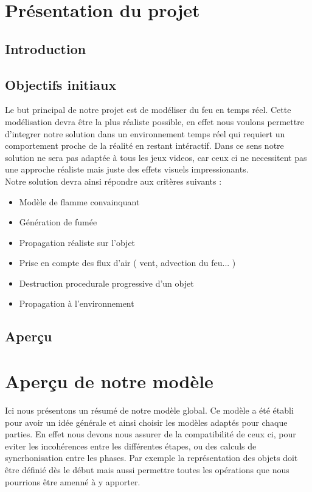 \documentclass[a4paper,10pt]{article}
\begin{document}
\newpage

\tableofcontents

\newpage



\section{Présentation du projet}
\subsection{Introduction}

\subsection{Objectifs initiaux}
Le but principal de notre projet est de modéliser du feu en temps
réel. Cette modélisation devra être la plus réaliste possible, en
effet nous voulons permettre d'integrer notre solution dans un
environnement temps réel qui requiert un comportement proche de la
réalité en restant intéractif. Dans ce sens notre solution ne sera pas
adaptée à tous les jeux videos, car ceux ci ne necessitent pas une
approche réaliste mais juste des effets visuels impressionants.\\

Notre solution devra ainsi répondre aux critères suivants :
\begin{itemize}
\item Modèle de flamme convainquant 
\item Génération de fumée
\item Propagation réaliste sur l'objet 
\item Prise en compte des flux d'air ( vent, advection du feu... )
\item Destruction procedurale progressive d'un objet
\item Propagation à l'environnement
\end{itemize}

\subsection{Aperçu}

\section{Aperçu de notre modèle}
Ici nous présentons un résumé de notre modèle global. Ce modèle a été
établi pour avoir un idée générale et ainsi choisir les modèles
adaptés pour chaque parties. En effet nous devons nous assurer de la
compatibilité de ceux ci, pour eviter les incohérences entre les
différentes étapes, ou des calculs de syncrhonisation entre les
phases. Par exemple la représentation des objets doit être définié dès
le début mais aussi permettre toutes les opérations que nous pourrions
être amenné à y apporter.
\end{document}
